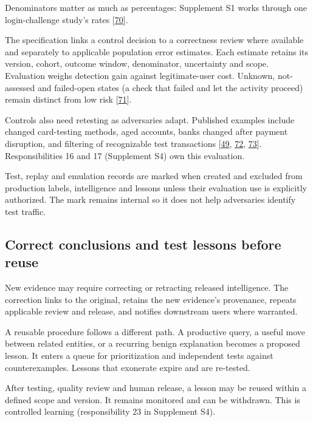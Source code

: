 \documentclass[acmlarge,review,anonymous,nonacm]{acmart}
\begin{document}
Denominators matter as much as percentages: Supplement S1 works through
one login-challenge study's rates
{[}\protect\hyperlink{ref-Doerfler2019}{70}{]}.

The specification links a control decision to a correctness review where
available and separately to applicable population error estimates. Each
estimate retains its version, cohort, outcome window, denominator,
uncertainty and scope. Evaluation weighs detection gain against
legitimate-user cost. Unknown, not-assessed and failed-open states (a
check that failed and let the activity proceed) remain distinct from low
risk {[}\protect\hyperlink{ref-Stripe2026PAYG}{71}{]}.

Controls also need retesting as adversaries adapt. Published examples
include changed card-testing methods, aged accounts, banks changed after
payment disruption, and filtering of recognizable test transactions
{[}\protect\hyperlink{ref-Thomas2013}{49},
\protect\hyperlink{ref-Meltzer2025}{72},
\protect\hyperlink{ref-Tian2018}{73}{]}. Responsibilities 16 and 17
(Supplement S4) own this evaluation.

Test, replay and emulation records are marked when created and excluded
from production labels, intelligence and lessons unless their evaluation
use is explicitly authorized. The mark remains internal so it does not
help adversaries identify test traffic.

\hypertarget{correct-conclusions-and-test-lessons-before-reuse}{%
\subsection{Correct conclusions and test lessons before
reuse}\label{correct-conclusions-and-test-lessons-before-reuse}}

New evidence may require correcting or retracting released intelligence.
The correction links to the original, retains the new evidence's
provenance, repeats applicable review and release, and notifies
downstream users where warranted.

A reusable procedure follows a different path. A productive query, a
useful move between related entities, or a recurring benign explanation
becomes a proposed lesson. It enters a queue for prioritization and
independent tests against counterexamples. Lessons that exonerate expire
and are re-tested.

After testing, quality review and human release, a lesson may be reused
within a defined scope and version. It remains monitored and can be
withdrawn. This is controlled learning (responsibility 23 in Supplement
S4).
\end{document}
